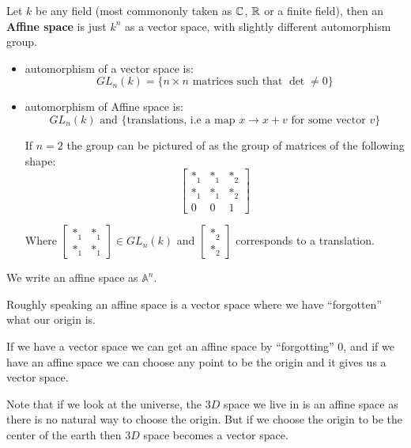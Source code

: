 \begin{definition}
    Let $k$ be any field (most commononly taken as $\mathbb{C}$, $\mathbb{R}$ or a finite field), then an \textbf{Affine space} is just $k^n$ as a vector space, with slightly different automorphism group.
    \begin{itemize}
        \item automorphism of a vector space is:\begin{equation*}
            GL_n(k) = \{n\times n\text{ matrices such that }\det \neq 0\}
        \end{equation*} 
        \item automorphism of Affine space is:\begin{equation*}
            GL_n(k) \text{ and } \{\text{translations, i.e a map }x\rightarrow x+v\text{ for some vector }v\}
        \end{equation*}

        If $n=2$ the group can be pictured of as the group of matrices of the following shape:
        \[\begin{bmatrix}
            \ast_1 & \ast_1 & \ast_2\\
            \ast_1 & \ast_1 & \ast_2\\
            0 & 0 & 1
        \end{bmatrix}\]

        Where $\begin{bmatrix}
            \ast_1 & \ast_1 \\
            \ast_1 & \ast_1 
        \end{bmatrix}\in GL_n(k)$ and $\begin{bmatrix}
             \ast_2\\
             \ast_2
        \end{bmatrix}$ corresponds to a translation.
    \end{itemize}
    We write an affine space as $\mathbb{A}^n$.

    Roughly speaking an affine space is a vector space where we have ``forgotten'' what our origin is.

    If we have a vector space we can get an affine space by ``forgotting'' $0$, and if we have an affine space we can choose any point to be the origin and it gives us a vector space.
\end{definition}

\begin{example}
    Note that if we look at the universe, the $3D$ space we live in is an affine space as there is no natural way to choose the origin.
    But if we choose the origin to be the center of the earth then $3D$ space becomes a vector space.
\end{example}


